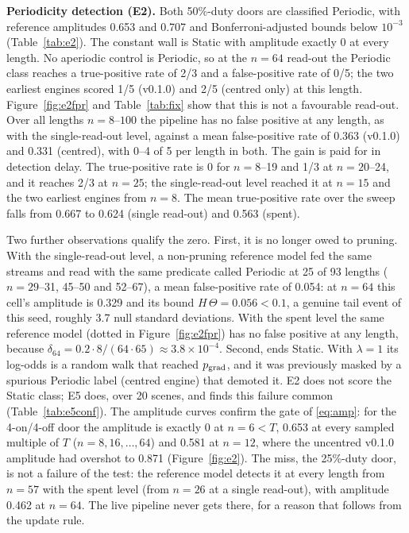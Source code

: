 

\noindent\textbf{Periodicity detection (E2).} Both 50\%-duty doors are classified Periodic, with reference amplitudes 0.653 and 0.707 and Bonferroni-adjusted bounds below $10^{-3}$ (Table~\ref{tab:e2}). The constant wall is Static with amplitude exactly 0 at every length. No aperiodic control is Periodic, so at the $n{=}64$ read-out the Periodic class reaches a true-positive rate of 2/3 and a false-positive rate of 0/5; the two earliest engines scored 1/5 (v0.1.0) and 2/5 (centred only) at this length. Figure~\ref{fig:e2fpr} and Table~\ref{tab:fix} show that this is not a favourable read-out. Over all lengths $n=8$--$100$ the pipeline has no false positive at any length, as with the single-read-out level, against a mean false-positive rate of 0.363 (v0.1.0) and 0.331 (centred), with 0--4 of 5 per length in both. The gain is paid for in detection delay. The true-positive rate is 0 for $n=8$--19 and 1/3 at $n=20$--24, and it reaches 2/3 at $n=25$; the single-read-out level reached it at $n=15$ and the two earliest engines from $n{=}8$. The mean true-positive rate over the sweep falls from 0.667 to 0.624 (single read-out) and 0.563 (spent).

Two further observations qualify the zero. First, it is no longer owed to pruning. With the single-read-out level, a non-pruning reference model fed the same streams and read with the same predicate called  Periodic at 25 of 93 lengths ($n=29$--31, 45--50 and 52--67), a mean false-positive rate of 0.054: at $n{=}64$ this cell's amplitude is 0.329 and its bound $H\,\Theta=0.056<0.1$, a genuine tail event of this seed, roughly 3.7 null standard deviations. With the spent level the same reference model (dotted in Figure~\ref{fig:e2fpr}) has no false positive at any length, because $\delta_{64}=0.2\cdot8/(64\cdot65)\approx3.8\times10^{-4}$. Second,  ends Static. With $\lambda{=}1$ its log-odds is a random walk that reached $p_{\mathrm{grad}}$, and it was previously masked by a spurious Periodic label (centred engine) that demoted it. E2 does not score the Static class; E5 does, over 20 scenes, and finds this failure common (Table~\ref{tab:e5conf}). The amplitude curves confirm the gate of \eqref{eq:amp}: for the 4-on/4-off door the amplitude is exactly 0 at $n{=}6<T$, 0.653 at every sampled multiple of $T$ ($n=8,16,\dots,64$) and 0.581 at $n{=}12$, where the uncentred v0.1.0 amplitude had overshot to 0.871 (Figure~\ref{fig:e2}). The miss, the 25\%-duty door, is not a failure of the test: the reference model detects it at every length from $n{=}57$ with the spent level (from $n{=}26$ at a single read-out), with amplitude 0.462 at $n{=}64$. The live pipeline never gets there, for a reason that follows from the update rule.

